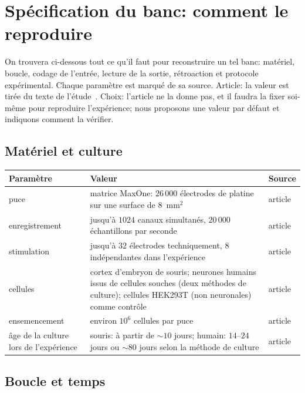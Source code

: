 \section{Spécification du banc: comment le reproduire}
\label{sec:dishspec}

On trouvera ci-dessous tout ce qu'il faut pour reconstruire un tel banc: matériel, boucle, codage de l'entrée, lecture de la sortie, rétroaction et protocole expérimental. Chaque paramètre est marqué de sa source. \og Article\fg{}: la valeur est tirée du texte de l'étude~\cite{Kagan2022}. \og Choix\fg{}: l'article ne la donne pas, et il faudra la fixer soi-même pour reproduire l'expérience; nous proposons une valeur par défaut et indiquons comment la vérifier.

\subsection*{Matériel et culture}

\begin{center}
\footnotesize
\setlength{\tabcolsep}{4pt}
\renewcommand{\arraystretch}{1.15}
\begin{tabular}{>{\raggedright}p{4.0cm}>{\raggedright}p{6.9cm}>{\raggedright\arraybackslash}p{1.6cm}}
\toprule
Paramètre & Valeur & Source \\
\midrule
puce & matrice MaxOne: $26\,000$ électrodes de platine sur une surface de $8$~mm$^2$ & article \\
enregistrement & jusqu'à $1024$ canaux simultanés, $20\,000$ échantillons par seconde & article \\
stimulation & jusqu'à $32$ électrodes techniquement, $8$ indépendantes dans l'expérience & article \\
cellules & cortex d'embryon de souris; neurones humains issus de cellules souches (deux méthodes de culture); cellules HEK293T (non neuronales) comme contrôle & article \\
ensemencement & environ $10^6$ cellules par puce & article \\
âge de la culture lors de l'expérience & souris: à partir de $\sim10$ jours; humain: $14$--$24$ jours ou $\sim80$ jours selon la méthode de culture & article \\
\bottomrule
\end{tabular}
\end{center}

\subsection*{Boucle et temps}


